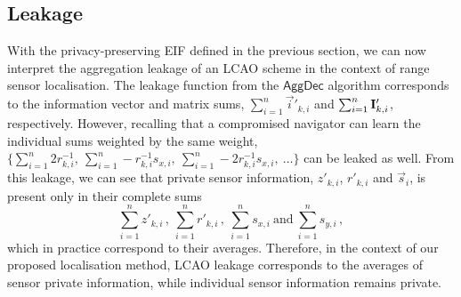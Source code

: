 \documentclass[10pt,letterpaper,oneside,twocolumn,journal]{IEEEtran}
\theoremstyle{definition}
\theoremstyle{definition}
\theoremstyle{remark}
\begin{document}
\subsection{Leakage} \label{subsec:leakage}
With the privacy-preserving EIF defined in the previous section, we can now interpret the aggregation leakage of an LCAO scheme in the context of range sensor localisation. The leakage function from the $\mathsf{AggDec}$ algorithm corresponds to the information vector and matrix sums, $\sum_{i=1}^n\vec{i}'_{k,i}$ and $\sum_{i=1}^n{{\mathbf{I}}}'_{k,i}$, respectively. However, recalling that a compromised navigator can learn the individual sums weighted by the same weight, $\{\sum_{i=1}^n2r^{-1}_{k,i},\ \sum_{i=1}^n-r^{-1}_{k,i}s_{x,i},\ \sum_{i=1}^n-2r^{-1}_{k,i}s_{x,i},\ \dots\}$ can be leaked as well. From this leakage, we can see that private sensor information, $z'_{k,i}$, $r'_{k,i}$ and $\vec{s}_i$, is present only in their complete sums
\begin{equation}
    \sum_{i=1}^nz'_{k,i}\,,\ \sum_{i=1}^nr'_{k,i}\,,\ \sum_{i=1}^ns_{x,i}\ \textrm{and}\ \sum_{i=1}^ns_{y,i}\,,\label{eqn:localisation_leakage}
\end{equation}
which in practice correspond to their averages. Therefore, in the context of our proposed localisation method, LCAO leakage corresponds to the averages of sensor private information, while individual sensor information remains private.

% 
%                                 
%                                 
%                                 
% 
\end{document}
